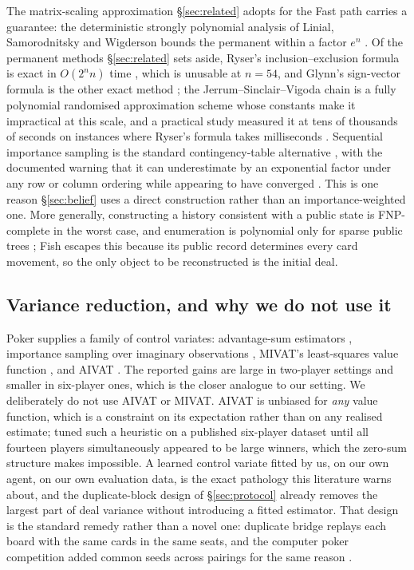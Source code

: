 \documentclass[11pt]{article}
\theoremstyle{definition}
\begin{document}
The matrix-scaling approximation \S\ref{sec:related} adopts for the Fast path
carries a guarantee: the deterministic strongly polynomial analysis of Linial,
Samorodnitsky and Wigderson bounds the permanent within a factor $e^n$
\cite{lsw}. Of the permanent methods \S\ref{sec:related} sets aside, Ryser's
inclusion--exclusion formula is exact in $O(2^n n)$ time \cite{ryser}, which
is unusable at $n = 54$, and Glynn's sign-vector formula is the other exact
method \cite{glynn}; the Jerrum--Sinclair--Vigoda chain is a fully polynomial
randomised approximation scheme \cite{jsv} whose constants make it impractical
at this scale, and a practical study measured it at tens of thousands of
seconds on instances where Ryser's formula takes milliseconds
\cite{newman-vardi}. Sequential importance sampling is the standard
contingency-table alternative \cite{chen-sis}, with the documented warning
that it can underestimate by an exponential factor under any row or column
ordering while appearing to have converged \cite{bezakova-sis}. This is one
reason \S\ref{sec:belief} uses a direct construction rather than an
importance-weighted one. More generally, constructing a history consistent
with a public state is FNP-complete in the worst case, and enumeration is
polynomial only for sparse public trees \cite{solinas-history}; Fish escapes
this because its public record determines every card movement, so the only
object to be reconstructed is the initial deal.

\subsection{Variance reduction, and why we do not use it}

Poker supplies a family of control variates: advantage-sum estimators
\cite{zinkevich-divat}, importance sampling over imaginary observations
\cite{bowling-is}, MIVAT's least-squares value function \cite{white-mivat},
and AIVAT \cite{burch-aivat,avaivat}. The reported gains are large in
two-player settings and smaller in six-player ones, which is the closer
analogue to our setting. We deliberately do not use AIVAT or MIVAT. AIVAT is
unbiased for \emph{any} value function, which is a constraint on its
expectation rather than on any realised estimate; \cite{kim-sandholm} tuned
such a heuristic on a published six-player dataset until all fourteen players
simultaneously appeared to be large winners, which the zero-sum structure
makes impossible. A learned control variate fitted by us, on our own agent, on
our own evaluation data, is the exact pathology this literature warns about,
and the duplicate-block design of \S\ref{sec:protocol} already removes the
largest part of deal variance without introducing a fitted estimator. That
design is the standard remedy rather than a novel one: duplicate bridge
replays each board with the same cards in the same seats, and the computer
poker competition added common seeds across pairings for the same reason
\cite{acpc}.
\end{document}
